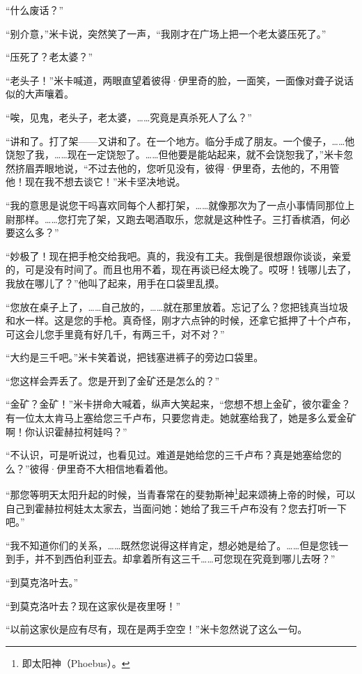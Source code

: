 \par “什么废话？”
\par “别介意，”米卡说，突然笑了一声，“我刚才在广场上把一个老太婆压死了。”
\par “压死了？老太婆？”
\par “老头子！”米卡喊道，两眼直望着彼得·伊里奇的脸，一面笑，一面像对聋子说话似的大声嚷着。
\par “唉，见鬼，老头子，老太婆，……究竟是真杀死人了么？”
\par “讲和了。打了架——又讲和了。在一个地方。临分手成了朋友。一个傻子，……他饶恕了我，……现在一定饶恕了。……但他要是能站起来，就不会饶恕我了，”米卡忽然挤眉弄眼地说，“不过去他的，您听见没有，彼得·伊里奇，去他的，不用管他！现在我不想去谈它！”米卡坚决地说。
\par “我的意思是说您干吗喜欢同每个人都打架，……就像那次为了一点小事情同那位上尉那样。……您打完了架，又跑去喝酒取乐，您就是这种性子。三打香槟酒，何必要这么多？”
\par “妙极了！现在把手枪交给我吧。真的，我没有工夫。我倒是很想跟你谈谈，亲爱的，可是没有时间了。而且也用不着，现在再谈已经太晚了。哎呀！钱哪儿去了，我放在哪儿了？”他叫了起来，用手在口袋里乱摸。
\par “您放在桌子上了，……自己放的，……就在那里放着。忘记了么？您把钱真当垃圾和水一样。这是您的手枪。真奇怪，刚才六点钟的时候，还拿它抵押了十个卢布，可这会儿您手里竟有好几千，有两三千，对不对？”
\par “大约是三千吧。”米卡笑着说，把钱塞进裤子的旁边口袋里。
\par “您这样会弄丢了。您是开到了金矿还是怎么的？”
\par “金矿？金矿！”米卡拼命大喊着，纵声大笑起来，“您想不想上金矿，彼尔霍金？有一位太太肯马上塞给您三千卢布，只要您肯走。她就塞给我了，她是多么爱金矿啊！你认识霍赫拉柯娃吗？”
\par “不认识，可是听说过，也看见过。难道是她给您的三千卢布？真是她塞给您的么？”彼得·伊里奇不大相信地看着他。
\par “那您等明天太阳升起的时候，当青春常在的斐勃斯神\footnote{即太阳神（Phoebus）。}起来颂祷上帝的时候，可以自己到霍赫拉柯娃太太家去，当面问她：她给了我三千卢布没有？您去打听一下吧。”
\par “我不知道你们的关系，……既然您说得这样肯定，想必她是给了。……但是您钱一到手，并不到西伯利亚去。却拿着所有这三千……可您现在究竟到哪儿去呀？”
\par “到莫克洛叶去。”
\par “到莫克洛叶去？现在这家伙是夜里呀！”
\par “以前这家伙是应有尽有，现在是两手空空！”米卡忽然说了这么一句。

